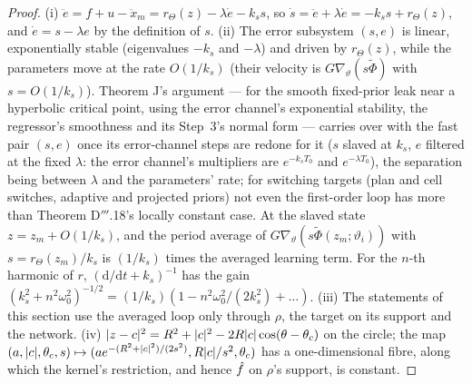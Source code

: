 \begin{proof}
(i) $\ddot e = f + u - \ddot x_m = r_\Theta(z) - \lambda\dot e - k_s s$, so
$\dot s = \ddot e + \lambda\dot e = -k_s s + r_\Theta(z)$, and $\dot e = s - \lambda e$ by the definition of $s$. (ii)
The error subsystem $(s,e)$ is linear, exponentially stable (eigenvalues $-k_s$ and $-\lambda$) and driven by
$r_\Theta(z)$, while the parameters move at the rate $O(1/k_s)$ (their velocity is $G\nabla_\vartheta(s\tilde\Phi)$
with $s = O(1/k_s)$). Theorem J's argument --- for the smooth fixed-prior leak near a hyperbolic critical point, using
the error channel's exponential stability, the regressor's smoothness and its Step~3's normal form --- carries over
with the fast pair $(s,e)$ once its error-channel steps are redone for it ($s$ slaved at $k_s$, $e$ filtered at the
fixed $\lambda$: the error channel's multipliers are $e^{-k_sT_0}$ and $e^{-\lambda T_0}$), the separation being
between $\lambda$ and the parameters' rate; for switching targets (plan and cell switches, adaptive and projected
priors) not even the first-order loop has more than Theorem D$'''$.18's locally constant case. At the slaved state
$z = z_m + O(1/k_s)$, and the period average of $G\nabla_\vartheta(s\tilde\Phi(z_m;\vartheta_i))$ with
$s = r_\Theta(z_m)/k_s$ is $(1/k_s)$ times the averaged learning term. For the $n$-th harmonic of $r$,
$(\mathrm{d}/\mathrm{d}t + k_s)^{-1}$ has the gain
$(k_s^2 + n^2\omega_0^2)^{-1/2} = (1/k_s)(1 - n^2\omega_0^2/(2k_s^2) + \dots)$. (iii) The statements of this section
use the averaged loop only through $\rho$, the target on its support and the network. (iv)
$\lvert z - c\rvert^2 = R^2 + \lvert c\rvert^2 - 2R\lvert c\rvert\cos(\theta - \theta_c)$ on the circle; the map
$(a,\lvert c\rvert,\theta_c,s)\mapsto(a e^{-(R^2+\lvert c\rvert^2)/(2s^2)},R\lvert c\rvert/s^2,\theta_c)$ has a one-dimensional fibre,
along which the kernel's restriction, and hence $\hat f$ on $\rho$'s support, is constant.
\end{proof}
